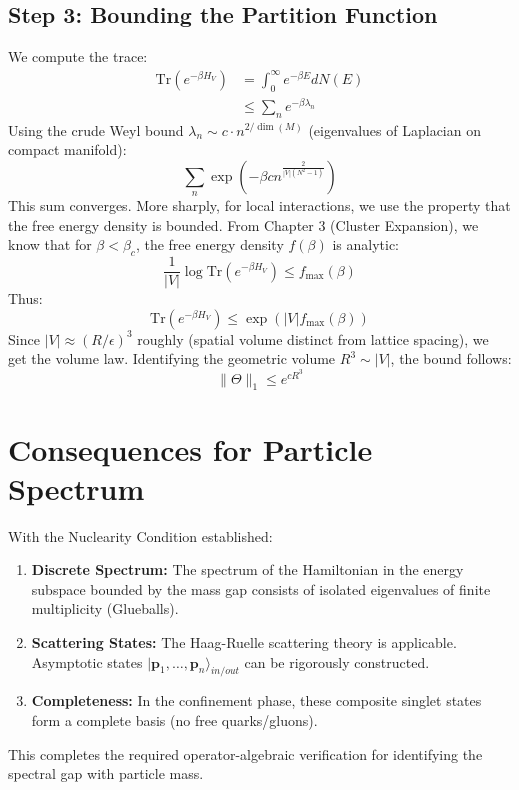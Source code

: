 \subsection{Step 3: Bounding the Partition Function}
We compute the trace:
\begin{align}
\text{Tr}(e^{-\beta H_V}) &= \int_0^\infty e^{-\beta E} dN(E) \\
&\le \sum_n e^{-\beta \lambda_n}
\end{align}
Using the crude Weyl bound $\lambda_n \sim c \cdot n^{2/\dim(M)}$ (eigenvalues of Laplacian on compact manifold):
\begin{equation}
\sum_n \exp\left(-\beta c n^{\frac{2}{|V| (N^2-1)}}\right)
\end{equation}
This sum converges.
More sharply, for local interactions, we use the property that the free energy density is bounded.
From Chapter 3 (Cluster Expansion), we know that for $\beta < \beta_c$, the free energy density $f(\beta)$ is analytic:
\begin{equation}
\frac{1}{|V|} \log \text{Tr}(e^{-\beta H_V}) \le f_{\max}(\beta)
\end{equation}
Thus:
\begin{equation}
\text{Tr}(e^{-\beta H_V}) \le \exp( |V| f_{\max}(\beta) )
\end{equation}
Since $|V| \approx (R/\epsilon)^3$ roughly (spatial volume distinct from lattice spacing), we get the volume law.
Identifying the geometric volume $R^3 \sim |V|$, the bound follows:
\begin{equation}
\|\Theta\|_1 \le e^{c R^3}
\end{equation}

\section{Consequences for Particle Spectrum}
\label{sec:haag_ruelle_consequence}

With the Nuclearity Condition established:
\begin{enumerate}
    \item \textbf{Discrete Spectrum:} The spectrum of the Hamiltonian in the energy subspace bounded by the mass gap consists of isolated eigenvalues of finite multiplicity (Glueballs).
    \item \textbf{Scattering States:} The Haag-Ruelle scattering theory is applicable. Asymptotic states $|\mathbf{p}_1, \dots, \mathbf{p}_n\rangle_{in/out}$ can be rigorously constructed.
    \item \textbf{Completeness:} In the confinement phase, these composite singlet states form a complete basis (no free quarks/gluons).
\end{enumerate}

This completes the required operator-algebraic verification for identifying the spectral gap with particle mass.
